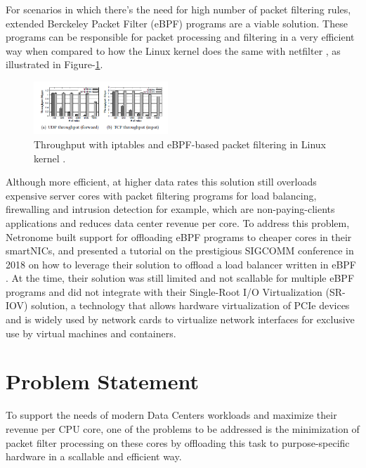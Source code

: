 \documentclass[conference]{IEEEtran}
\begin{document}
For scenarios in which there's the need for high number of packet filtering rules, extended Berckeley Packet Filter (eBPF) programs are a viable solution. These programs can be responsible for packet processing and filtering in a very efficient way when compared to how the Linux kernel does the same with netfilter \cite{vieira:2020:fast-ebpf-xdp} \cite{miano:2018:ebpf-experience} \cite{bertrone:2018:ebpf-throughput}, as illustrated in Figure-\ref{fig:ebpf-throughput}.

\begin{figure}[ht]
    \centering
    \includegraphics[width=0.45\textwidth]{figures/ebpf.png}
    \caption{ Throughput with iptables and eBPF-based packet filtering in Linux kernel \cite{bertrone:2018:ebpf-throughput}.}
    \label{fig:ebpf-throughput}
\end{figure}

Although more efficient, at higher data rates this solution still overloads expensive server cores with packet filtering programs for load balancing, firewalling and intrusion detection for example, which are non-paying-clients applications and reduces data center revenue per core. To address this problem, Netronome built support for offloading eBPF programs to cheaper cores in their smartNICs, and presented a tutorial on the prestigious SIGCOMM conference in 2018 on how to leverage their solution to offload a load balancer written in eBPF \cite{beckett:2018:ebpf-xdp}. At the time, their solution was still limited and not scallable for multiple eBPF programs and did not integrate with their Single-Root I/O Virtualization (SR-IOV) solution, a technology that allows hardware virtualization of PCIe devices and is widely used by network cards to virtualize network interfaces for exclusive use by virtual machines and containers.

\section{Problem Statement}
To support the needs of modern Data Centers workloads and maximize their revenue per CPU core, one of the problems to be addressed is the minimization of packet filter processing on these cores by offloading this task to purpose-specific hardware in a scallable and efficient way.
\end{document}
